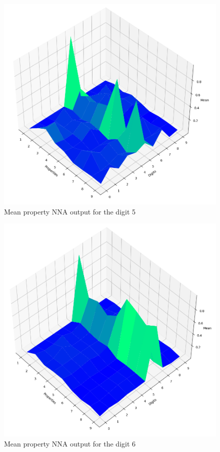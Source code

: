 \documentclass[conference]{IEEEtran}
\begin{document}
\begin{figure}[htbp]
\centerline{\includegraphics[width=150mm]{./images/digit-5.png}}
\caption{Mean property NNA output for the digit 5}
\label{digit5votes}
\end{figure}

\begin{figure}[htbp]
\centerline{\includegraphics[width=150mm]{./images/digit-6.png}}
\caption{Mean property NNA output for the digit 6}
\label{digit6votes}
\end{figure}


{}
\end{document}
